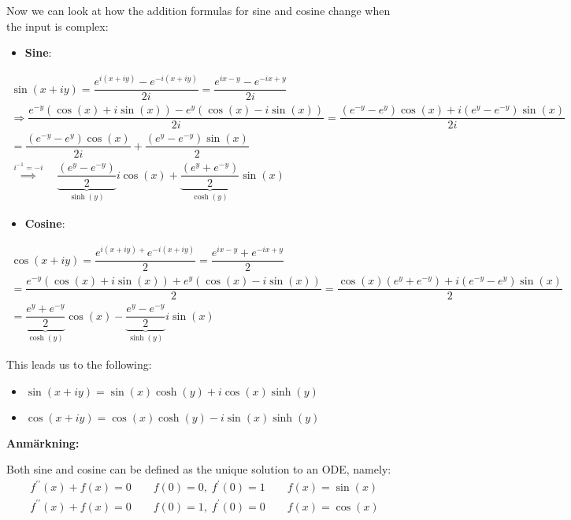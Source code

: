 \par\bigskip
\noindent Now we can look at how the addition formulas for sine and cosine change when the input is complex:
\par\bigskip
\begin{itemize}
  \item\textbf{Sine}:
\end{itemize}
\begin{equation*}
  \begin{gathered}
    \sin(x+iy) = \dfrac{e^{i(x+iy)}-e^{-i(x+iy)}}{2i} = \dfrac{e^{ix-y}-e^{-ix+y}}{2i}\\
    \Rightarrow \dfrac{e^{-y}(\cos(x)+i\sin(x))-e^y(\cos(x)-i\sin(x))}{2i} = \dfrac{(e^{-y}-e^y)\cos(x)+i(e^y-e^{-y})\sin(x)}{2i}\\
    = \dfrac{(e^{-y}-e^y)\cos(x)}{2i}+\dfrac{(e^y-e^{-y})\sin(x)}{2}\\
    \stackrel{i^{-1}=-i}{\implies}\quad\underbrace{\dfrac{(e^y-e^{-y})}{2}}_{\text{$\sinh(y)$}}i\cos(x)+\underbrace{\dfrac{(e^y+e^{-y})}{2}}_{\text{$\cosh(y)$}}\sin(x)
  \end{gathered}
\end{equation*}
\par\bigskip
\begin{itemize}
  \item\textbf{Cosine}:
\end{itemize}
\begin{equation*}
  \begin{gathered}
    \cos(x+iy) = \dfrac{e^{i(x+iy)+}e^{-i(x+iy)}}{2} = \dfrac{e^{ix-y}+e^{-ix+y}}{2}\\
    = \dfrac{e^{-y}(\cos(x)+i\sin(x))+e^y(\cos(x)-i\sin(x))}{2} = \dfrac{\cos(x)(e^y+e^{-y})+i(e^{-y}-e^y)\sin(x)}{2}\\
    = \underbrace{\dfrac{e^y+e^{-y}}{2}}_{\text{$\cosh(y)$}}\cos(x)-\underbrace{\dfrac{e^y-e^{-y}}{2}}_{\text{$\sinh(y)$}}i\sin(x)
  \end{gathered}
\end{equation*}
\par\bigskip
\noindent This leads us to the following:
\newpage
\begin{theo}{}
  \begin{itemize}
    \item $\sin(x+iy) = \sin(x)\cosh(y)+i\cos(x)\sinh(y)$
    \item $\cos(x+iy) = \cos(x)\cosh(y)-i\sin(x)\sinh(y)$
  \end{itemize}
\end{theo}
\par\bigskip
\noindent\textbf{Anmärkning:}\par
\noindent Both sine and cosine can be defined as the unique solution to an ODE, namely:
\begin{equation*}
  \begin{gathered}
    f^{\prime\prime}(x)+f(x) = 0\qquad f(0) = 0,\;f^{\prime}(0)=1\qquad f(x) = \sin(x)\\
    f^{\prime\prime}(x)+f(x)=0\qquad f(0)=1,\;f^{\prime}(0)=0\qquad f(x) = \cos(x)
  \end{gathered}
\end{equation*}
\par\bigskip
